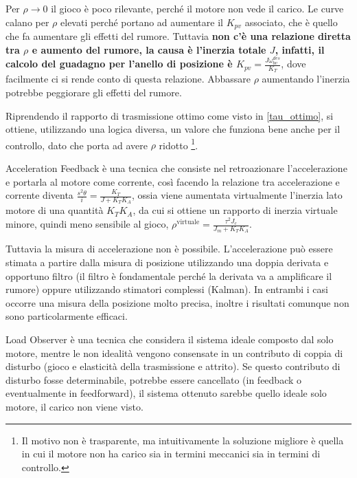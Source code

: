 Per \(\rho \rightarrow 0\) il gioco è poco rilevante, perché il motore non vede il carico. Le curve calano per \(\rho\) elevati perché portano ad aumentare il \(K_{pv}\) associato, che è quello che fa aumentare gli effetti del rumore. Tuttavia \textbf{non c'è una relazione diretta tra \(\rho\) e aumento del rumore, la causa è l'inerzia totale \(J\), infatti, il calcolo del guadagno per l'anello di posizione è \(K_{pv} = \frac{J \omega_{bv}^{des}}{K_T}\)}, dove facilmente ci si rende conto di questa relazione. Abbassare \(\rho\) aumentando l'inerzia potrebbe peggiorare gli effetti del rumore.

Riprendendo il rapporto di trasmissione ottimo come visto in \ref{tau_ottimo}, si ottiene, utilizzando una logica diversa, un valore che funziona bene anche per il controllo, dato che porta ad avere \(\rho\) ridotto \footnote{Il motivo non è trasparente, ma intuitivamente la soluzione migliore è quella in cui il motore non ha carico sia in termini meccanici sia in termini di controllo.}.



Acceleration Feedback è una tecnica che consiste nel retroazionare l'accelerazione e portarla al motore come corrente, così facendo la relazione tra accelerazione e corrente diventa \(\frac{s^2\theta}{i} = \frac{K_T}{J + K_TK_A}\), ossia viene aumentata virtualmente l'inerzia lato motore di una quantità \(K_TK_A\), da cui si ottiene un rapporto di inerzia virtuale minore, quindi meno sensibile al gioco, \(\rho^\text{virtuale}=\frac{\tau^2 J_c}{J_m + K_TK_A}\).

Tuttavia la misura di accelerazione non è possibile. L'accelerazione può essere stimata a partire dalla misura di posizione utilizzando una doppia derivata e opportuno filtro (il filtro è fondamentale perché la derivata va a amplificare il rumore) oppure utilizzando stimatori complessi (Kalman). In entrambi i casi occorre una misura della posizione molto precisa, inoltre i risultati comunque non sono particolarmente efficaci.\label{misura_acc}



Load Observer è una tecnica che considera il sistema ideale composto dal solo motore, mentre le non idealità vengono consensate in un contributo di coppia di disturbo (gioco e elasticità della trasmissione e attrito).
Se questo contributo di disturbo fosse determinabile, potrebbe essere cancellato (in feedback o eventualmente in feedforward), il sistema ottenuto sarebbe quello ideale solo motore, il carico non viene visto.

